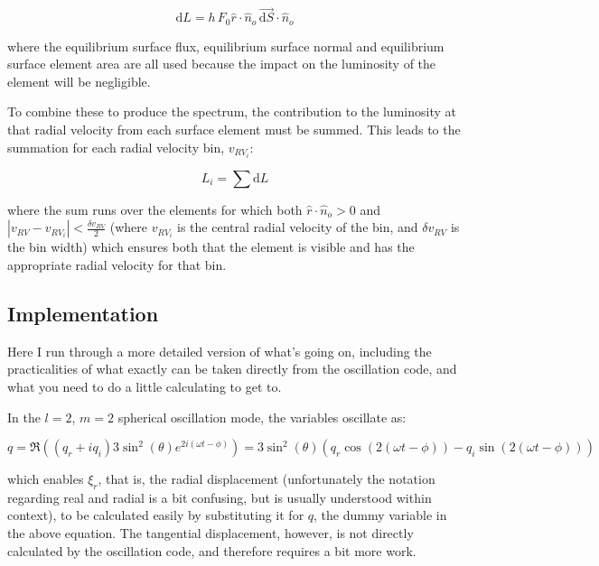 \documentclass[11pt]{amsart}
\begin{document}
\begin{equation}
\text{d}L = h \, F_{0} \hat{r} \cdot \hat{n}_{o} \, \vec{\text{d}S} \! \cdot \! \hat{n}_{o}
\end{equation}

where the equilibrium surface flux, equilibrium surface normal and equilibrium surface element area are all used because the impact on the luminosity of the element will be negligible.

To combine these to produce the spectrum, the contribution to the luminosity at that radial velocity from each surface element must be summed.  This leads to the summation for each radial velocity bin, $v_{RV_{i}}$:

\begin{equation}
L_{i} = \sum \text{d}L
\end{equation}

where the sum runs over the elements for which both $\hat{r} \cdot \hat{n}_{o} > 0$ and $| v_{RV} - v_{RV_{i}} | < \frac{\delta v_{RV}}{2}$ (where $v_{RV_{i}}$ is the central radial velocity of the bin, and $\delta v_{RV}$ is the bin width) which ensures both that the element is visible and has the appropriate radial velocity for that bin.



\subsection{Implementation} \label{RV:Implementation}

Here I run through a more detailed version of what's going on, including the practicalities of what exactly can be taken directly from the oscillation code, and what you need to do a little calculating to get to.

In the $l=2$, $m=2$ spherical oscillation mode, the variables oscillate as:

\begin{equation}
q = \Re \left(  \left( q_{r} + i q_{i} \right)  3 \sin^{2}(\theta) e^{2 i ( \omega t - \phi)}   \right)   =    3 \sin^{2}(\theta) \left(  q_{r} \cos \left( 2 ( \omega t - \phi) \right)  - q_{i} \sin \left( 2 ( \omega t - \phi) \right) \right) 
\end{equation}

which enables $\xi_{r}$, that is, the radial displacement (unfortunately the notation regarding real and radial is a bit confusing, but is usually understood within context), to be calculated easily by substituting it for $q$, the dummy variable in the above equation.  The tangential displacement, however, is not directly calculated by the oscillation code, and therefore requires a bit more work.
\end{document}
